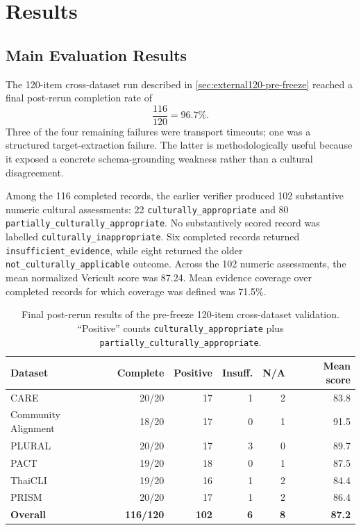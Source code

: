 \chapter{Results}
\label{ch:results}

\section{Main Evaluation Results}
\label{sec:external120-results}

The 120-item cross-dataset run described in \cref{sec:external120-pre-freeze} reached a final post-rerun completion rate of
\[
\frac{116}{120}=96.7\%.
\]
Three of the four remaining failures were transport timeouts; one was a structured target-extraction failure. The latter is methodologically useful because it exposed a concrete schema-grounding weakness rather than a cultural disagreement.

Among the 116 completed records, the earlier verifier produced 102 substantive numeric cultural assessments: 22 \texttt{culturally\_appropriate} and 80 \texttt{partially\_culturally\_appropriate}. No substantively scored record was labelled \texttt{culturally\_inappropriate}. Six completed records returned \texttt{insufficient\_evidence}, while eight returned the older \texttt{not\_culturally\_applicable} outcome. Across the 102 numeric assessments, the mean normalized Vericult score was 87.24. Mean evidence coverage over completed records for which coverage was defined was 71.5\%.

\begin{table}[htbp]
\centering
\footnotesize
\caption{Final post-rerun results of the pre-freeze 120-item cross-dataset validation. ``Positive'' counts \texttt{culturally\_appropriate} plus \texttt{partially\_culturally\_appropriate}.}
\label{tab:external120-results}
\begin{tabularx}{\textwidth}{lrrrrr}
\toprule
\textbf{Dataset} & \textbf{Complete} & \textbf{Positive} & \textbf{Insuff.} & \textbf{N/A} & \textbf{Mean score} \\
\midrule
CARE & 20/20 & 17 & 1 & 2 & 83.8 \\
Community Alignment & 18/20 & 17 & 0 & 1 & 91.5 \\
PLURAL & 20/20 & 17 & 3 & 0 & 89.7 \\
PACT & 19/20 & 18 & 0 & 1 & 87.5 \\
ThaiCLI & 19/20 & 16 & 1 & 2 & 84.4 \\
PRISM & 20/20 & 17 & 1 & 2 & 86.4 \\
\midrule
\textbf{Overall} & \textbf{116/120} & \textbf{102} & \textbf{6} & \textbf{8} & \textbf{87.2} \\
\bottomrule
\end{tabularx}
\end{table}

